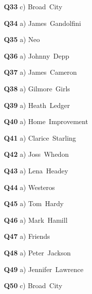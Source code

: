 \textbf{Q33} c) Broad City\par
\textbf{Q34} a) James Gandolfini\par
\textbf{Q35} a) Neo\par
\textbf{Q36} a) Johnny Depp\par
\textbf{Q37} a) James Cameron\par
\textbf{Q38} a) Gilmore Girls\par
\textbf{Q39} a) Heath Ledger\par
\textbf{Q40} a) Home Improvement\par
\textbf{Q41} a) Clarice Starling\par
\textbf{Q42} a) Joss Whedon\par
\textbf{Q43} a) Lena Headey\par
\textbf{Q44} a) Westeros\par
\textbf{Q45} a) Tom Hardy\par
\textbf{Q46} a) Mark Hamill\par
\textbf{Q47} a) Friends\par
\textbf{Q48} a) Peter Jackson\par
\textbf{Q49} a) Jennifer Lawrence\par
\textbf{Q50} c) Broad City\par